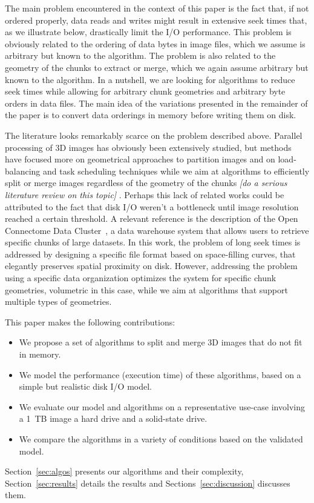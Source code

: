 \documentclass[10pt, conference, compsocconf]{IEEEtran}
\newcommand{\todo}[1]{
  \color{red}\emph{[#1]}
  \color{black}
}
\begin{document}
The main problem encountered in the context of this paper is the fact
that, if not ordered properly, data reads and writes might result in
extensive seek times that, as we illustrate below, drastically limit
the I/O performance. This problem is obviously related to the ordering
of data bytes in image files, which we assume is arbitrary but known
to the algorithm. The problem is also related to the geometry of the
chunks to extract or merge, which we again assume arbitrary but known
to the algorithm. In a nutshell, we are looking for algorithms to
reduce seek times while allowing for arbitrary chunk geometries and
arbitrary byte orders in data files. The main idea of the variations
presented in the remainder of the paper is to convert data orderings
in memory before writing them on disk. 

The literature looks remarkably scarce on the problem described
above. Parallel processing of 3D images has obviously been extensively
studied, but methods have focused more on geometrical approaches to
partition images and on load-balancing and task scheduling techniques
while we aim at algorithms to efficiently split or merge images
regardless of the geometry of the chunks \todo{do a serious literature
review on this topic}. Perhaps this lack of related works could be
attributed to the fact that disk I/O weren't a bottleneck until image
resolution reached a certain threshold. A relevant reference is the
description of the Open Connectome Data Cluster~\cite{burns2013open},
a data warehouse system that allows users to retrieve specific chunks
of large datasets. In this work, the problem of long seek times is
addressed by designing a specific file format based on space-filling
curves, that elegantly preserves spatial proximity on disk. However,
addressing the problem using a specific data organization optimizes
the system for specific chunk geometries, volumetric in this case,
while we aim at algorithms that support multiple types of geometries.

This paper makes the following contributions:
\begin{itemize}
  \item We propose a set of algorithms to split and merge 3D images
    that do not fit in memory.
  \item We model the performance (execution time) of these algorithms,
    based on a simple but realistic disk I/O model.
  \item We evaluate our model and algorithms on a representative
    use-case involving a 1~TB image a hard drive and a solid-state
    drive.
  \item We compare the algorithms in a variety of conditions based on the validated model.
\end{itemize}
Section~\ref{sec:algos} presents our algorithms and their complexity,
Section~\ref{sec:results} details the results and
Sections~\ref{sec:discussion} discusses them.
\end{document}
